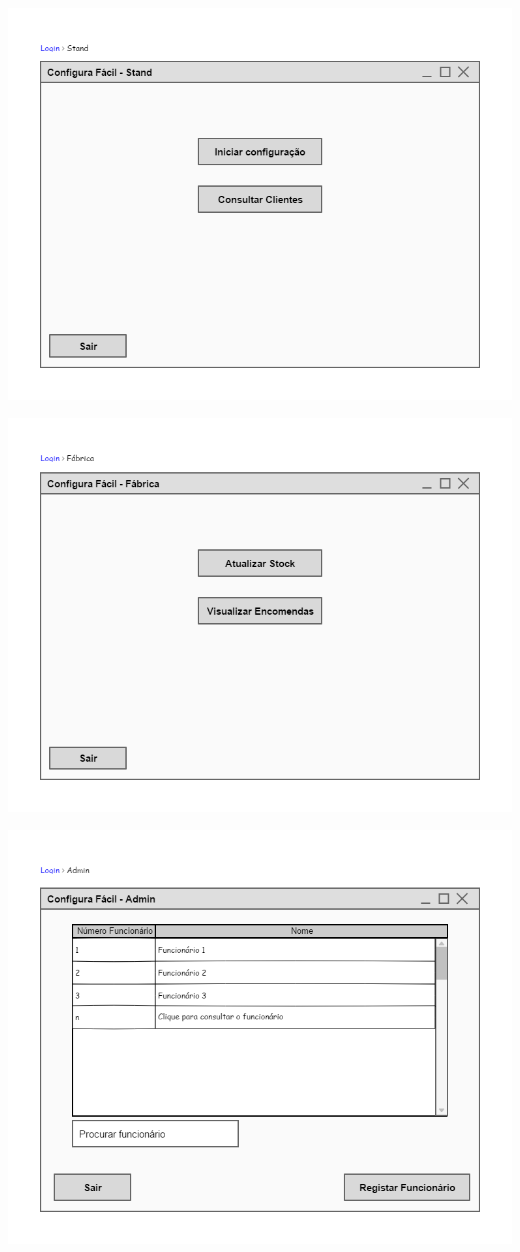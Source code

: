 \begin{center}
 	\includegraphics[width = 5.5in]{Prototipagem/configura_fcil_stand.png}

 	\includegraphics[width = 5.5in]{Prototipagem/configura_fcil_fbrica.png}

 	\includegraphics[width = 5.5in]{Prototipagem/configura_fcil_admin.png}
\end{center}


